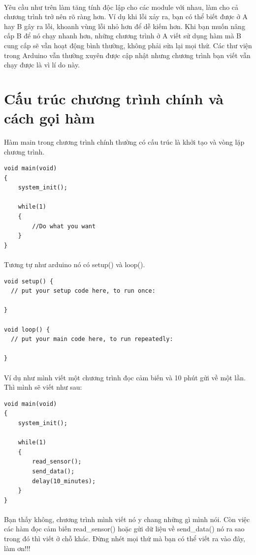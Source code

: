 \documentclass[12pt,a5paper]{book}
\begin{document}
\paragraph{}
Yêu cầu như trên làm tăng tính độc lập cho các module với nhau, làm cho cả chương trình trở nên rõ ràng hơn. Ví dụ khi lỗi xảy ra, bạn có thể biết được ở A hay B gây ra lỗi, khoanh vùng lỗi nhỏ hơn để dễ kiếm hơn. Khi bạn muốn nâng cấp B để nó chạy nhanh hơn, những chương trình ở A viết sử dụng hàm mà B cung cấp sẽ vẫn hoạt động bình thường, không phải sửa lại mọi thứ. Các thư viện trong Arduino vẫn thường xuyên được cập nhật nhưng chương trình bạn viết vẫn chạy được là vì lí do này.

\section{Cấu trúc chương trình chính và cách gọi hàm}
\paragraph{}
Hàm main trong chương trình chính thường có cấu trúc là khởi tạo và vòng lặp chương trình. 
\begin{lstlisting}
void main(void)
{
	system_init();
	
	while(1)
	{
		//Do what you want
	}
}
\end{lstlisting}
\paragraph{}
Tương tự như arduino nó có setup() và loop().
\begin{lstlisting}
void setup() {
  // put your setup code here, to run once:

}

void loop() {
  // put your main code here, to run repeatedly:

}
\end{lstlisting}
\paragraph{}
Ví dụ như mình viết một chương trình đọc cảm biến và 10 phút gửi về một lần. Thì mình sẽ viết như sau:
\begin{lstlisting}
void main(void)
{
	system_init();
	
	while(1)
	{
		read_sensor();
		send_data();
		delay(10_minutes);
	}
}
\end{lstlisting}
\paragraph{}
Bạn thấy không, chương trình mình viết nó y chang những gì mình nói. Còn việc các hàm đọc cảm biến read\_sensor() hoặc gửi dữ liệu về send\_data() nó ra sao trong đó thì viết ở chỗ khác. Đừng nhét mọi thứ mà bạn có thể viết ra vào đây, làm ơn!!!
\end{document}
